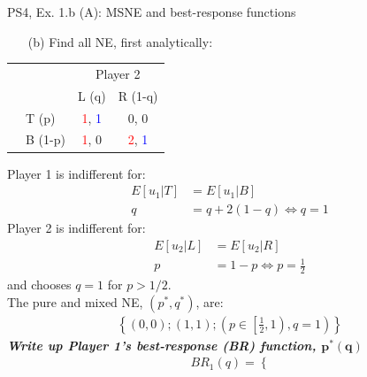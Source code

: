 \begin{frame}{PS4, Ex. 1.b (A): MSNE and best-response functions}
  \begin{multicols}{2}
    \begin{itemize}
      \item[(b)] Find all NE, first analytically:
    \end{itemize}
    \begin{table}
      \begin{tabular}{cl|c|c|}
        & \multicolumn{1}{c}{} & \multicolumn{2}{c}{\color{blue}Player 2}\\
        \parbox[t]{1mm}{}
        &  &  &  \\
        & T (p) & \textcolor{red}{1}, \textcolor{blue}{1} & 0, 0 \\
        & B (1-p) & \textcolor{red}{1}, 0 & \textcolor{red}{2}, \textcolor{blue}{1} \\
      \end{tabular}
    \end{table}
    Player 1 is indifferent for:
    \begin{align*}
      E[u_1|T]&=E[u_1|B]\\
      q &= q + 2(1-q) \Leftrightarrow q = 1
    \end{align*}
    Player 2 is indifferent for:
    \begin{align*}
      E[u_2|L]&=E[u_2|R]\\
      p &= 1-p \Leftrightarrow p = \frac{1}{2}
    \end{align*}
    and chooses $q=1$ for $p>1/2$.\\\medskip
    The pure and mixed NE, $(p^{*},q^{*})$, are:
    \begin{align*}
      \left\{(0,0);(1,1);\left(p\in\left[\frac{1}{2},1\right),q=1\right)\right\}
    \end{align*}
    \textbf{\textit{Write up Player 1's best-response (BR) function, $\bm{p^{*}(q)}$}}
  \vfill\null \columnbreak
    \begin{align*}
      BR_1(q)=\left\{ \right.
    \end{align*}
  \vfill\null
  \end{multicols}
\end{frame}
